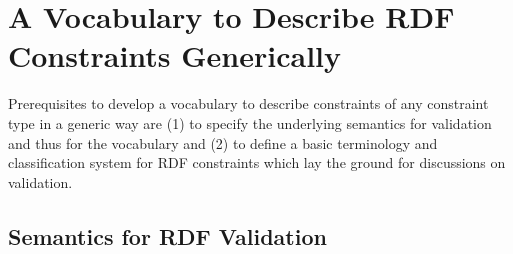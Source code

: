\documentclass[a4paper,fontsize=11pt]{scrartcl}
\begin{document}
\section{A Vocabulary to Describe RDF Constraints Generically} 
\label{sec:vocabulary}

Prerequisites to develop a vocabulary to describe constraints of any constraint type in a generic way are 
(1) to specify the underlying semantics for validation and thus for the vocabulary and (2) to define a basic terminology and classification system for RDF constraints which lay the ground for discussions on validation.

\subsection{Semantics for RDF Validation}
\end{document}
